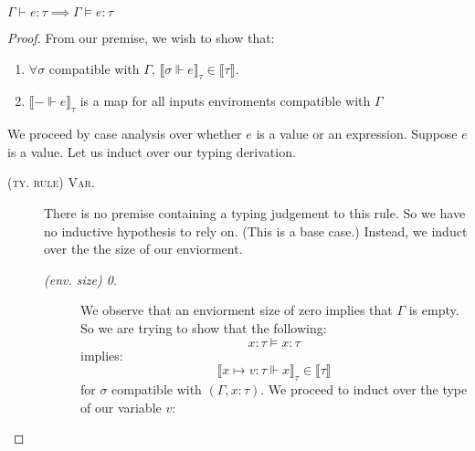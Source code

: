 \begin{theorem}
$\Gamma \vdash e : \tau \implies \Gamma \vDash e : \tau$
\end{theorem}
\begin{proof}
From our premise, we wish to show that:
  \begin{enumerate}
    \item $\forall \sigma$ compatible with $\Gamma$, $\llbracket \sigma \Vdash e
      \rrbracket_{\tau} \in \llbracket \tau \rrbracket$.
    \item $\llbracket - \Vdash e
      \rrbracket_{\tau}$ is a  map for all inputs enviroments
      compatible with $\Gamma$
  \end{enumerate}
We proceed by case analysis over whether $e$ is a value or an expression.
  Suppose $e$ is a value. Let us induct over our typing derivation. 
\begin{description}
  \item[\textsc{(ty. rule) Var.}] There is no premise containing a typing
    judgement to this rule. So we have no inductive hypothesis to rely on.
    (This is a base case.)
    Instead, we induct over the the size of our enviorment.
    \begin{description}
      \item[\textit{(env. size) 0.}] We observe that an enviorment size of zero
        implies that $\Gamma$ is empty. So we are trying to show that the
        following:
        $$x : \tau \vDash x : \tau$$
        implies:
        $$\llbracket x \mapsto v : \tau \Vdash x \rrbracket_\tau \in \llbracket \tau
        \rrbracket$$
        for $\sigma$ compatible with $(\Gamma, x : \tau)$. We proceed to induct over
        the type of our variable $v$:
\end{description}
\end{description}
\end{proof}
